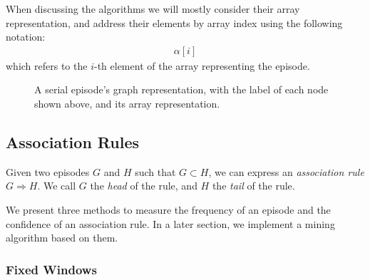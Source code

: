 When discussing the algorithms we will mostly consider their array representation, and address their elements by array index using the following notation:
\begin{align*}
\alpha [i]
\end{align*}
which refers to the $ i $-th element of the array representing the episode.

\begin{figure}
\centering


\caption{A serial episode's graph representation, with the label of each node shown above, and its array representation.}
\label{fig:serial-representation}
\end{figure}

\subsection{Association Rules}
\begin{definition}
Given two episodes $ G $ and $ H $ such that $ G \subset H $, we can express an \emph{association rule} $ G \Rightarrow H $. We call $ G $ the \emph{head} of the rule, and $ H $ the \emph{tail} of the rule.
\end{definition}

We present three methods to measure the frequency of an episode and the confidence of an association rule. In a later section, we implement a mining algorithm based on them.

\subsubsection{Fixed Windows}

